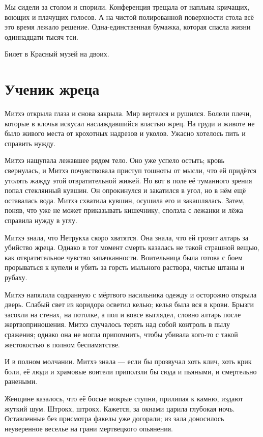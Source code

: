 Мы сидели за столом и спорили.
Конференция трещала от наплыва кричащих, воющих и плачущих голосов.
А на чистой полированной поверхности стола всё это время лежало решение.
Одна-единственная бумажка, которая спасла жизни одиннадцати тысяч тси.

Билет в Красный музей на двоих.

\section{Ученик жреца}

Митхэ открыла глаза и снова закрыла.
Мир вертелся и рушился.
Болели плечи, которые в клочья искусал наслаждавшийся властью жрец.
На груди и животе не было живого места от крохотных надрезов и уколов.
Ужасно хотелось пить и справить нужду.

Митхэ нащупала лежавшее рядом тело.
Оно уже успело остыть;
кровь свернулась, и Митхэ почувствовала приступ тошноты от мысли, что ей придётся утолять жажду этой отвратительной жижей.
Но вот в поле её туманного зрения попал стеклянный кувшин.
Он опрокинулся и закатился в угол, но в нём ещё оставалась вода.
Митхэ схватила кувшин, осушила его и закашлялась.
Затем, поняв, что уже не может приказывать кишечнику, сползла с лежанки и лёжа справила нужду в углу.

Митхэ знала, что Нетрукха скоро хватятся.
Она знала, что ей грозит алтарь за убийство жреца.
Однако в тот момент смерть казалась не такой страшной вещью, как отвратительное чувство запачканности.
Воительница была готова с боем прорываться к купели и убить за горсть мыльного раствора, чистые штаны и рубаху.

Митхэ напялила содранную с мёртвого насильника одежду и осторожно открыла дверь.
Слабый свет из коридора осветил келью;
келья была вся в крови.
Брызги засохли на стенах, на потолке, а пол и вовсе выглядел, словно алтарь после жертвоприношения.
Митхэ случалось терять над собой контроль в пылу сражения;
однако она не могла припомнить, чтобы убивала кого-то с такой жестокостью в полном беспамятстве.

И в полном молчании.
Митхэ знала --- если бы прозвучал хоть клич, хоть крик боли, её люди и храмовые воители приползли бы сюда и пьяными, и смертельно ранеными.

Женщине казалось, что её босые мокрые ступни, прилипая к камню, издают жуткий шум.
Штрокх, штрокх.
Кажется, за окнами царила глубокая ночь.
Оставленные без присмотра факелы уже догорали;
из зала доносилось неуверенное веселье на грани мертвецкого опьянения.

